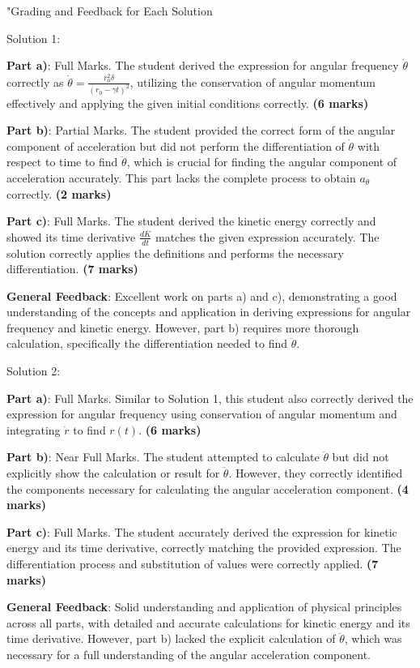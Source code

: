 \documentclass[a4paper,11pt]{article}
\begin{document}
"Grading and Feedback for Each Solution

Solution 1:

\textbf{Part a)}: Full Marks. The student derived the expression for angular frequency \( \dot{\theta} \) correctly as \(\dot{\theta} = \frac{r_0^2 \delta}{(r_0 - \gamma t)^2}\), utilizing the conservation of angular momentum effectively and applying the given initial conditions correctly. \textbf{(6 marks)}

\textbf{Part b)}: Partial Marks. The student provided the correct form of the angular component of acceleration but did not perform the differentiation of \(\dot{\theta}\) with respect to time to find \(\ddot{\theta}\), which is crucial for finding the angular component of acceleration accurately. This part lacks the complete process to obtain \(a_{\theta}\) correctly. \textbf{(2 marks)}

\textbf{Part c)}: Full Marks. The student derived the kinetic energy correctly and showed its time derivative \(\frac{dK}{dt}\) matches the given expression accurately. The solution correctly applies the definitions and performs the necessary differentiation. \textbf{(7 marks)}

\textbf{General Feedback}: Excellent work on parts a) and c), demonstrating a good understanding of the concepts and application in deriving expressions for angular frequency and kinetic energy. However, part b) requires more thorough calculation, specifically the differentiation needed to find \(\ddot{\theta}\).

Solution 2:

\textbf{Part a)}: Full Marks. Similar to Solution 1, this student also correctly derived the expression for angular frequency using conservation of angular momentum and integrating \(\dot{r}\) to find \(r(t)\). \textbf{(6 marks)}

\textbf{Part b)}: Near Full Marks. The student attempted to calculate \(\ddot{\theta}\) but did not explicitly show the calculation or result for \(\ddot{\theta}\). However, they correctly identified the components necessary for calculating the angular acceleration component. \textbf{(4 marks)}

\textbf{Part c)}: Full Marks. The student accurately derived the expression for kinetic energy and its time derivative, correctly matching the provided expression. The differentiation process and substitution of values were correctly applied. \textbf{(7 marks)}

\textbf{General Feedback}: Solid understanding and application of physical principles across all parts, with detailed and accurate calculations for kinetic energy and its time derivative. However, part b) lacked the explicit calculation of \(\ddot{\theta}\), which was necessary for a full understanding of the angular acceleration component.
\end{document}
